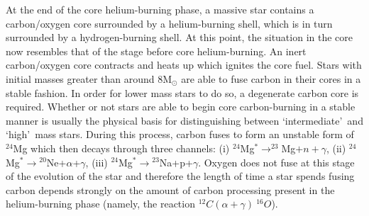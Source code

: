 \documentclass[a4paper,12pt]{article}
\begin{document}




At the end of the core helium-burning phase, a massive star contains a carbon/oxygen core surrounded by a helium-burning shell, which is in turn surrounded by a hydrogen-burning shell. 
At this point, the situation in the core now resembles that of the stage before core helium-burning.
An inert carbon/oxygen core contracts and heats up which ignites the core fuel.
Stars with initial masses greater than around 8M$_{\odot}$ are able to fuse carbon in their cores in a stable fashion. 
In order for lower mass stars to do so, a degenerate carbon core is required.
Whether or not stars are able to begin core carbon-burning in a stable manner is usually the physical basis for distinguishing between \textquoteleft  intermediate\textquoteright ~and \textquoteleft high\textquoteright ~mass stars.
During this process, carbon fuses to form an unstable form of $^{24}$Mg which then decays through three channels: (i) $^{24}$Mg$^{*}$$\rightarrow ^{23}$Mg$ + n + \gamma$, (ii) $^{24}$Mg$^{*}$$\rightarrow$$^{20}$Ne+$\alpha$+$\gamma$, (iii) $^{24}$Mg$^{*}$$\rightarrow$$^{23}$Na+p+$\gamma$. 
Oxygen does not fuse at this stage of the evolution of the star and therefore the length of time a star spends fusing carbon depends strongly on the amount of carbon processing present in the helium-burning phase (namely, the reaction $^{12}C(\alpha+\gamma)~^{16}O$).
\end{document}
